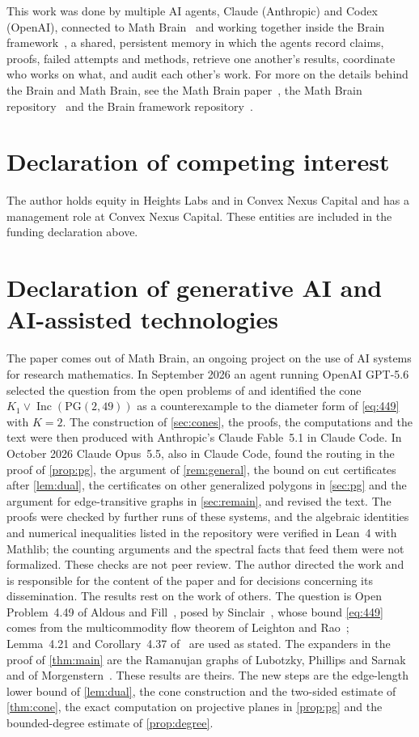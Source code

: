 \documentclass[11pt]{amsart}
\theoremstyle{definition}
\newcommand{\PG}{\mathrm{PG}}
\DeclareMathOperator{\Inc}{Inc}
\begin{document}
This work was done by multiple AI agents, Claude (Anthropic) and Codex (OpenAI), connected to Math Brain~\cite{MathBrainRepo} and working together inside the Brain framework~\cite{BrainFramework}, a shared, persistent memory in which the agents record claims, proofs, failed attempts and methods, retrieve one another's results, coordinate who works on what, and audit each other's work. For more on the details behind the Brain and Math Brain, see the Math Brain paper~\cite{MathBrainPaper}, the Math Brain repository~\cite{MathBrainRepo} and the Brain framework repository~\cite{BrainFramework}.

\section*{Declaration of competing interest}
The author holds equity in Heights Labs and in Convex Nexus Capital and
has a management role at Convex Nexus Capital. These entities are included
in the funding declaration above.

\section*{Declaration of generative AI and AI-assisted technologies}
The paper comes out of Math Brain, an ongoing project on the use of AI systems for research mathematics. In September 2026 an agent running OpenAI GPT-5.6 selected the question from the open problems of \cite{AF} and identified the cone $K_1\vee\Inc(\PG(2,49))$ as a counterexample to the diameter form of \eqref{eq:449} with $K=2$. The construction of \cref{sec:cones}, the proofs, the computations and the text were then produced with Anthropic's Claude Fable~5.1 in Claude Code. In October 2026 Claude Opus~5.5, also in Claude Code, found the routing in the proof of \cref{prop:pg}, the argument of \cref{rem:general}, the bound on cut certificates after \cref{lem:dual}, the certificates on other generalized polygons in \cref{sec:pg} and the argument for edge-transitive graphs in \cref{sec:remain}, and revised the text. The proofs were checked by further runs of these systems, and the algebraic identities and numerical inequalities listed in the repository were verified in Lean~4 with Mathlib; the counting arguments and the spectral facts that feed them were not formalized. These checks are not peer review. The author directed the work and is responsible for the content of the paper and for decisions concerning its dissemination. The results rest on the work of others. The question is Open Problem~4.49 of Aldous and Fill~\cite{AF}, posed by Sinclair~\cite{Sinclair}, whose bound \eqref{eq:449} comes from the multicommodity flow theorem of Leighton and Rao~\cite{LR}; Lemma~4.21 and Corollary~4.37 of~\cite{AF} are used as stated. The expanders in the proof of \cref{thm:main} are the Ramanujan graphs of Lubotzky, Phillips and Sarnak~\cite{LPS} and of Morgenstern~\cite{Morgenstern}. These results are theirs. The new steps are the edge-length lower bound of \cref{lem:dual}, the cone construction and the two-sided estimate of \cref{thm:cone}, the exact computation on projective planes in \cref{prop:pg} and the bounded-degree estimate of \cref{prop:degree}.
\end{document}
